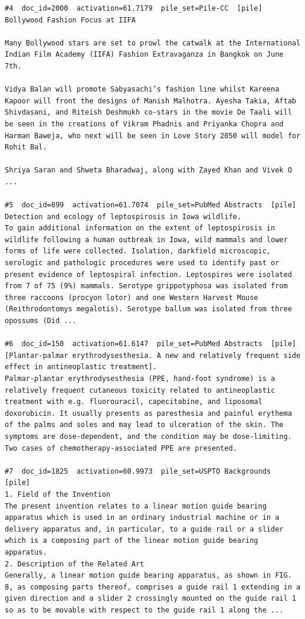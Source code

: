 \begin{verbatim}
#4  doc_id=2000  activation=61.7179  pile_set=Pile-CC  [pile]
Bollywood Fashion Focus at IIFA

Many Bollywood stars are set to prowl the catwalk at the International Indian Film Academy (IIFA) Fashion Extravaganza in Bangkok on June 7th.

Vidya Balan will promote Sabyasachi’s fashion line whilst Kareena Kapoor will front the designs of Manish Malhotra. Ayesha Takia, Aftab Shivdasani, and Riteish Deshmukh co-stars in the movie De Taali will be seen in the creations of Vikram Phadnis and Priyanka Chopra and Harman Baweja, who next will be seen in Love Story 2050 will model for Rohit Bal.

Shriya Saran and Shweta Bharadwaj, along with Zayed Khan and Vivek O ...

#5  doc_id=899  activation=61.7074  pile_set=PubMed Abstracts  [pile]
Detection and ecology of leptospirosis in Iowa wildlife.
To gain additional information on the extent of leptospirosis in wildlife following a human outbreak in Iowa, wild mammals and lower forms of life were collected. Isolation, darkfield microscopic, serologic and pathologic procedures were used to identify past or present evidence of leptospiral infection. Leptospires were isolated from 7 of 75 (9%) mammals. Serotype grippotyphosa was isolated from three raccoons (procyon lotor) and one Western Harvest Mouse (Reithrodontomys megalotis). Serotype ballum was isolated from three opossums (Did ...

#6  doc_id=150  activation=61.6147  pile_set=PubMed Abstracts  [pile]
[Plantar-palmar erythrodysesthesia. A new and relatively frequent side effect in antineoplastic treatment].
Palmar-plantar erythrodysesthesia (PPE, hand-foot syndrome) is a relatively frequent cutaneous toxicity related to antineoplastic treatment with e.g. fluorouracil, capecitabine, and liposomal doxorubicin. It usually presents as paresthesia and painful erythema of the palms and soles and may lead to ulceration of the skin. The symptoms are dose-dependent, and the condition may be dose-limiting. Two cases of chemotherapy-associated PPE are presented.

#7  doc_id=1825  activation=60.9973  pile_set=USPTO Backgrounds  [pile]
1. Field of the Invention
The present invention relates to a linear motion guide bearing apparatus which is used in an ordinary industrial machine or in a delivery apparatus and, in particular, to a guide rail or a slider which is a composing part of the linear motion guide bearing apparatus.
2. Description of the Related Art
Generally, a linear motion guide bearing apparatus, as shown in FIG. 8, as composing parts thereof, comprises a guide rail 1 extending in a given direction and a slider 2 crossingly mounted on the guide rail 1 so as to be movable with respect to the guide rail 1 along the ...


\end{verbatim}
